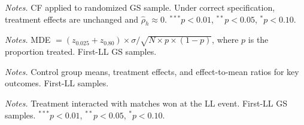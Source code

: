 
\begin{table}[htbp]
\centering
\caption{Control Function Validation on GS Lottery Sample (First-LL)}
\label{tab:cf_validation}
\begin{threeparttable}
\small

\begin{tablenotes}
\footnotesize
\item \textit{Notes.} CF applied to randomized GS sample. Under correct specification, treatment effects are unchanged and $\hat{\rho}_h \approx 0$. $^{***}p<0.01$, $^{**}p<0.05$, $^{*}p<0.10$.
\end{tablenotes}
\end{threeparttable}
\end{table}


\begin{table}[htbp]
\centering
\caption{Minimum Detectable Effects at 80\% Power (First-LL)}
\label{tab:power}
\begin{threeparttable}
\small

\begin{tablenotes}
\footnotesize
\item \textit{Notes.} MDE $= (z_{0.025} + z_{0.80}) \times \sigma / \sqrt{N \times p \times (1-p)}$, where $p$ is the proportion treated. First-LL GS samples.
\end{tablenotes}
\end{threeparttable}
\end{table}


\begin{table}[htbp]
\centering
\caption{Economic Magnitudes (First-LL)}
\label{tab:magnitudes}
\begin{threeparttable}
\scriptsize

\begin{tablenotes}
\footnotesize
\item \textit{Notes.} Control group means, treatment effects, and effect-to-mean ratios for key outcomes. First-LL samples.
\end{tablenotes}
\end{threeparttable}
\end{table}


\begin{table}[htbp]
\centering
\caption{Dose-Response: Grand Slam (First-LL)}
\label{tab:dose_gs}
\begin{threeparttable}
\small

\begin{tablenotes}
\footnotesize
\item \textit{Notes.} Treatment interacted with matches won at the LL event. First-LL GS samples. $^{***}p<0.01$, $^{**}p<0.05$, $^{*}p<0.10$.
\end{tablenotes}
\end{threeparttable}
\end{table}

